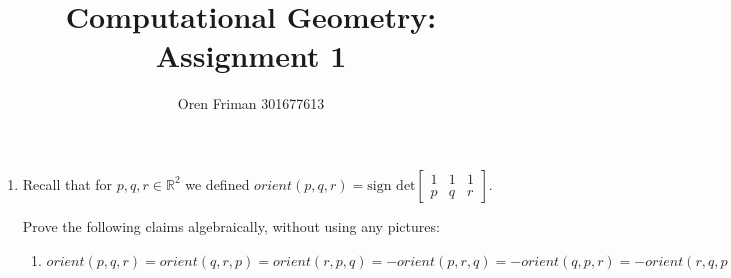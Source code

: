 \documentclass[a4paper, 8pt, oneside]{article}
\newcommand{\R}{\mathbb{R}}
\begin{document}
\title{Computational Geometry: Assignment 1}
\author{Oren Friman 301677613}
\maketitle

\medskip

\begin{enumerate}
\item
 Recall that for $p, q, r \in \R^2$ we defined $orient(p,q,r) = \text{sign det}
\begin{bmatrix}
    1 &1 & 1 \\
    p &q & r
\end{bmatrix}$.

Prove the following claims algebraically, without using any pictures:
 \begin{enumerate}
\item  \label{item:orient} $orient(p,q,r) = orient(q,r,p) = orient(r,p,q) = -orient(p,r,q) = -orient(q,p,r) = -orient(r,q,p)$


\end{enumerate}
\end{enumerate}
\end{document}
